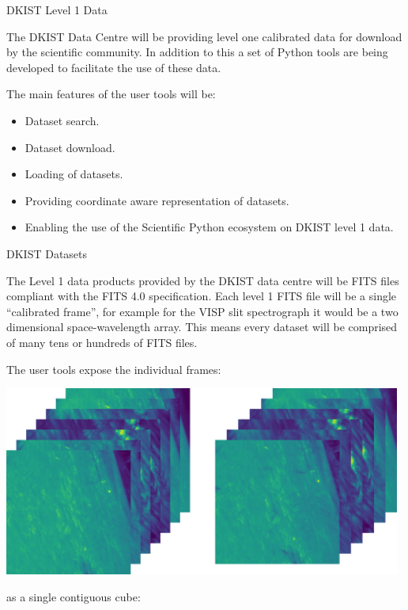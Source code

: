 \documentclass[landscape,a0paper,fontscale=0.32]{baposter}
\begin{document}
\begin{poster}
 
\begin{posterbox}[name=intro,column=0,row=0,span=2]{DKIST Level 1 Data}

  The DKIST Data Centre will be providing level one calibrated data for download
  by the scientific community. In addition to this a set of Python tools are
  being developed to facilitate the use of these data.

  The main features of the user tools will be:
  \begin{itemize}
  \item Dataset search.
  \item Dataset download.
  \item Loading of datasets.
  \item Providing coordinate aware representation of datasets.
  \item Enabling the use of the Scientific Python ecosystem on DKIST level 1
    data.
  \end{itemize}

  
\end{posterbox}

\begin{posterbox}[name=dataset,column=0,row=0,span=1,below=intro]{DKIST Datasets}

  The Level 1 data products provided by the DKIST data centre will be FITS files
  compliant with the FITS 4.0 specification. Each level 1 FITS file will be a
  single ``calibrated frame'', for example for the VISP slit spectrograph it
  would be a two dimensional space-wavelength array. This means every dataset
  will be comprised of many tens or hundreds of FITS files.

  The user tools expose the individual frames:

  \includegraphics[width=0.98\textwidth]{sequence_of_images.png}

  as a single contiguous cube:


\end{posterbox}
\end{poster}
\end{document}
